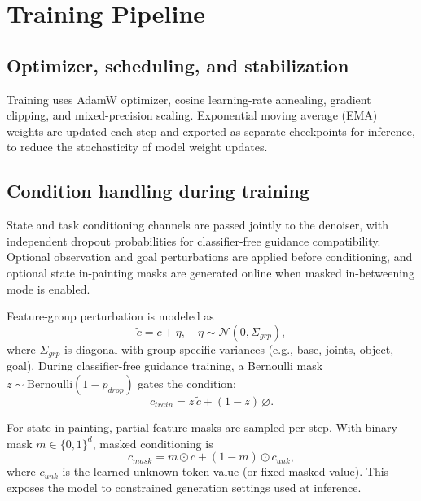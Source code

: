 \section{Training Pipeline}

\subsection{Optimizer, scheduling, and stabilization}

Training uses AdamW optimizer, cosine learning-rate annealing, gradient clipping, and mixed-precision scaling. Exponential moving average (EMA) weights are updated each step and exported as separate checkpoints for inference, to reduce the stochasticity of model weight updates.

\subsection{Condition handling during training}

State and task conditioning channels are passed jointly to the denoiser, with independent dropout probabilities for classifier-free guidance compatibility. Optional observation and goal perturbations are applied before conditioning, and optional state in-painting masks are generated online when masked in-betweening mode is enabled.

Feature-group perturbation is modeled as
\begin{equation}
\tilde c = c + \eta, \quad \eta \sim \mathcal{N}(0,\Sigma_{grp}),
\label{eq:cond_noise}
\end{equation}
where $\Sigma_{grp}$ is diagonal with group-specific variances (e.g., base, joints, object, goal). During classifier-free guidance training, a Bernoulli mask $z \sim \mathrm{Bernoulli}(1-p_{drop})$ gates the condition:
\begin{equation}
c_{train} = z\,\tilde c + (1-z)\,\varnothing.
\label{eq:cfg_dropout}
\end{equation}

For state in-painting, partial feature masks are sampled per step. With binary mask $m \in \{0,1\}^d$, masked conditioning is
\begin{equation}
c_{mask} = m \odot c + (1-m) \odot c_{unk},
\label{eq:partial_mask}
\end{equation}
where $c_{unk}$ is the learned unknown-token value (or fixed masked value). This exposes the model to constrained generation settings used at inference.

